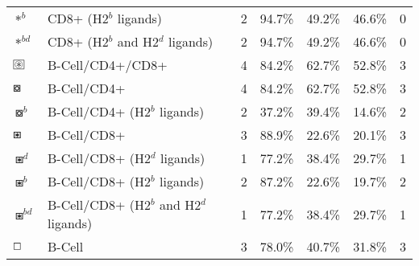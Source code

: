 \begin{tabular}{llccccc}
                                          $ \ast^b $ &                    CD8+ (H2$^b$ ligands) &            2 &         94.7\% &          49.2\% &         46.6\% &                          0 \\
                                       $ \ast^{bd} $ &         CD8+ (H2$^b$ and H2$^d$ ligands) &            2 &         94.7\% &          49.2\% &         46.6\% &                          0 \\
 $ \setlength{\fboxsep}{0.5pt} \boxed{\circledast} $ &                         B-Cell/CD4+/CD8+ &            4 &         84.2\% &          62.7\% &         52.8\% &                          3 \\
                                      $ \boxcircle $ &                              B-Cell/CD4+ &            4 &         84.2\% &          62.7\% &         52.8\% &                          3 \\
                                    $ \boxcircle^b $ &             B-Cell/CD4+ (H2$^b$ ligands) &            2 &         37.2\% &          39.4\% &         14.6\% &                          2 \\
                                         $ \boxast $ &                              B-Cell/CD8+ &            3 &         88.9\% &          22.6\% &         20.1\% &                          3 \\
                                       $ \boxast^d $ &             B-Cell/CD8+ (H2$^d$ ligands) &            1 &         77.2\% &          38.4\% &         29.7\% &                          1 \\
                                       $ \boxast^b $ &             B-Cell/CD8+ (H2$^b$ ligands) &            2 &         87.2\% &          22.6\% &         19.7\% &                          2 \\
                                    $ \boxast^{bd} $ &  B-Cell/CD8+ (H2$^b$ and H2$^d$ ligands) &            1 &         77.2\% &          38.4\% &         29.7\% &                          1 \\
                                       $ \boxempty $ &                                   B-Cell &            3 &         78.0\% &          40.7\% &         31.8\% &                          3 \\
\bottomrule
\end{tabular}
